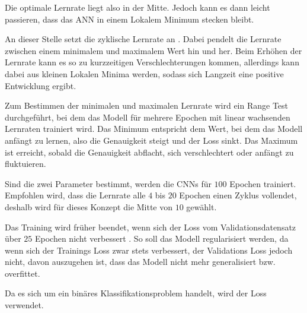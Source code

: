 Die optimale Lernrate liegt also in der Mitte.
Jedoch kann es dann leicht passieren, dass das \ac{ANN} in einem Lokalem Minimum stecken bleibt.

An dieser Stelle setzt die zyklische Lernrate an \cite{smith_cyclical_2017}.
Dabei pendelt die Lernrate zwischen einem minimalem und maximalem Wert hin und her.
Beim Erhöhen der Lernrate kann es so zu kurzzeitigen Verschlechterungen kommen, allerdings kann dabei aus kleinen Lokalen Minima  werden, sodass sich Langzeit eine positive Entwicklung ergibt.

Zum Bestimmen der minimalen und maximalen Lernrate wird ein Range Test durchgeführt, bei dem das Modell für mehrere Epochen mit linear wachsenden Lernraten trainiert wird.
Das Minimum entspricht dem Wert, bei dem das Modell anfängt zu lernen, also die Genauigkeit steigt und der Loss sinkt.
Das Maximum ist erreicht, sobald die Genauigkeit abflacht, sich verschlechtert oder anfängt zu fluk­tu­ie­ren. 

Sind die zwei Parameter bestimmt, werden die \acp{CNN} für $100$ Epochen trainiert.
Empfohlen wird, dass die Lernrate alle $4$ bis $20$ Epochen einen Zyklus vollendet, deshalb wird für dieses Konzept die Mitte von $10$ gewählt.

Das Training wird früher beendet, wenn sich der Loss vom Validationsdatensatz über $25$ Epochen nicht verbessert . 
So soll das Modell regularisiert werden, da wenn sich der Trainings Loss zwar stets verbessert, der Validations Loss jedoch nicht, davon auszugehen ist, dass das Modell nicht mehr generalisiert bzw. overfittet.

Da es sich um ein binäres Klassifikationsproblem handelt, wird der  Loss verwendet.





